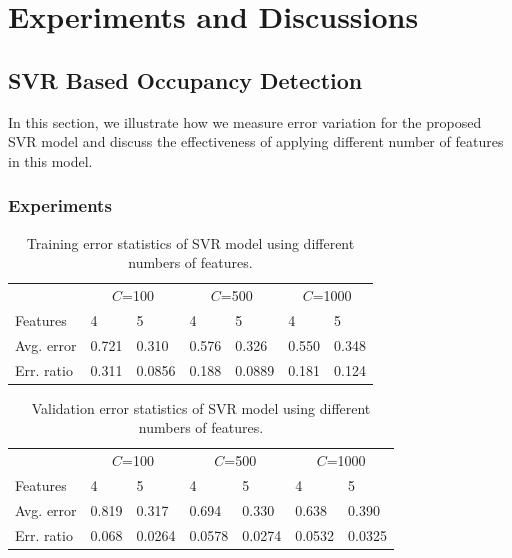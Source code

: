 \section{Experiments and Discussions}
\label{sec:results}
\subsection{SVR Based Occupancy Detection}
In this section, we illustrate how we measure error variation for
the proposed SVR model and discuss the effectiveness of applying
different number of features in this model.

\subsubsection{Experiments}
\begin{table}[!h]
\label{table:training}
\caption{Training error statistics of SVR model using different numbers of features.}
\centering
\begin{tabular}{m{1.2cm}m{0.8cm}m{0.8cm}m{0.8cm}m{0.8cm}m{0.8cm}m{0.8cm}}
\hline
& \multicolumn{2}{c}{$C$=100} & \multicolumn{2}{c}{$C$=500} & \multicolumn{2}{c}{$C$=1000} \\
\cline{2-7}
Features &   \hspace{0.2cm} 4  &\hspace{0.2cm}   5  &\hspace{0.2cm}   4  &\hspace{0.2cm}   5  &\hspace{0.2cm}   4  & \hspace{0.2cm}  5  \\
\hline
Avg. error&0.721& 0.310   & 0.576 &  0.326   &  0.550  &  0.348        \\
Err. ratio&0.311& 0.0856  & 0.188 &  0.0889  &  0.181  &  0.124        \\
\hline
\end{tabular}
\end{table}


\begin{table}[!h]
\label{table:testing}
\caption{Validation error statistics of SVR model using different numbers of features.}
\centering
\begin{tabular}{m{1.2cm}m{0.8cm}m{0.8cm}m{0.8cm}m{0.8cm}m{0.8cm}m{0.8cm}}
\hline
& \multicolumn{2}{c}{$C$=100} & \multicolumn{2}{c}{$C$=500} & \multicolumn{2}{c}{$C$=1000} \\
\cline{2-7}
Features &   \hspace{0.2cm} 4  &\hspace{0.2cm}   5  &\hspace{0.2cm}   4  &\hspace{0.2cm}   5  &\hspace{0.2cm}   4  & \hspace{0.2cm}  5  \\
\hline
Avg. error&0.819& 0.317   & 0.694 &  0.330   &  0.638  &  0.390        \\
Err. ratio&0.068& 0.0264  & 0.0578 &  0.0274  &  0.0532  &  0.0325        \\
\hline
\end{tabular}
\end{table}

